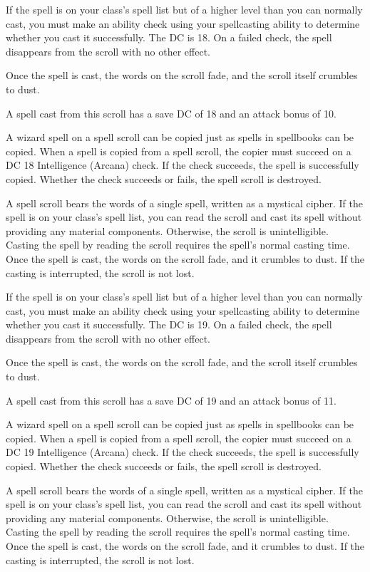 \documentclass[10pt,a4paper,twoside,bg=print,twocolumn,openany,nodeprecatedcode]{dndbook}
\begin{document}
If the spell is on your class's spell list but of a higher level than you can normally cast, you must make an ability check using your spellcasting ability to determine whether you cast it successfully. The DC is 18. On a failed check, the spell disappears from the scroll with no other effect.

Once the spell is cast, the words on the scroll fade, and the scroll itself crumbles to dust.

A spell cast from this scroll has a save DC of 18 and an attack bonus of 10.

A wizard spell on a spell scroll can be copied just as spells in spellbooks can be copied. When a spell is copied from a spell scroll, the copier must succeed on a DC 18 Intelligence (Arcana) check. If the check succeeds, the spell is successfully copied. Whether the check succeeds or fails, the spell scroll is destroyed.

A spell scroll bears the words of a single spell, written as a mystical cipher. If the spell is on your class's spell list, you can read the scroll and cast its spell without providing any material components. Otherwise, the scroll is unintelligible. Casting the spell by reading the scroll requires the spell's normal casting time. Once the spell is cast, the words on the scroll fade, and it crumbles to dust. If the casting is interrupted, the scroll is not lost.

If the spell is on your class's spell list but of a higher level than you can normally cast, you must make an ability check using your spellcasting ability to determine whether you cast it successfully. The DC is 19. On a failed check, the spell disappears from the scroll with no other effect.

Once the spell is cast, the words on the scroll fade, and the scroll itself crumbles to dust.

A spell cast from this scroll has a save DC of 19 and an attack bonus of 11.

A wizard spell on a spell scroll can be copied just as spells in spellbooks can be copied. When a spell is copied from a spell scroll, the copier must succeed on a DC 19 Intelligence (Arcana) check. If the check succeeds, the spell is successfully copied. Whether the check succeeds or fails, the spell scroll is destroyed.

A spell scroll bears the words of a single spell, written as a mystical cipher. If the spell is on your class's spell list, you can read the scroll and cast its spell without providing any material components. Otherwise, the scroll is unintelligible. Casting the spell by reading the scroll requires the spell's normal casting time. Once the spell is cast, the words on the scroll fade, and it crumbles to dust. If the casting is interrupted, the scroll is not lost.
\end{document}
